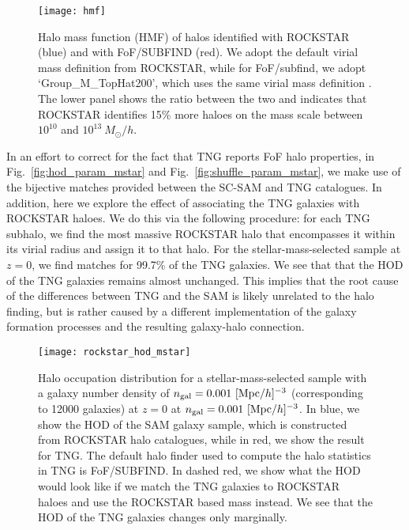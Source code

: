 \documentclass[fleqn,usenatbib]{mnras}
\begin{document}
\begin{figure}
\centering  
\texttt{[image: hmf]}
\caption{Halo mass function (HMF) of halos identified with \textsc{ROCKSTAR} (blue) and with FoF/\textsc{SUBFIND} (red). We adopt the default virial mass definition from \textsc{ROCKSTAR}, while for FoF/subfind, we adopt `Group\_M\_TopHat200', which uses the same virial mass definition \citep{1998ApJ...495...80B}. The lower panel shows the ratio between the two and indicates that \textsc{ROCKSTAR} identifies 15\% more haloes on the mass scale between $10^{10}$ and ${10^13} \ M_\odot/h$.}
\label{fig:hmf}
\end{figure}

In an effort to correct for the fact that TNG reports FoF halo properties, in Fig.~\ref{fig:hod_param_mstar} and Fig.~\ref{fig:shuffle_param_mstar}, we make use of the bijective matches provided between the SC-SAM and TNG catalogues. In addition, here we explore the effect of associating the TNG galaxies with \textsc{ROCKSTAR} haloes. We do this via the following procedure: for each TNG subhalo, we find the most massive \textsc{ROCKSTAR} halo that encompasses it within its virial radius and assign it to that halo. For the stellar-mass-selected sample at $z = 0$, we find matches for 99.7\% of the TNG galaxies. We see that that the HOD of the TNG galaxies remains almost unchanged. This implies that the root cause of the differences between TNG and the SAM is likely unrelated to the halo finding, but is rather caused by a different implementation of the galaxy formation processes and the resulting galaxy-halo connection.

\begin{figure}
\centering  
\texttt{[image: rockstar\_hod\_mstar]}
\caption{Halo occupation distribution for a stellar-mass-selected sample with a galaxy number density of $n_{\rm gal} = 0.001 \ [{\rm Mpc}/h]^{-3}$ (corresponding to 12000 galaxies) at $z = 0$ at $n_{\rm gal} = 0.001 \ [{\rm Mpc}/h]^{-3}$. In blue, we show the HOD of the SAM galaxy sample, which is constructed from ROCKSTAR halo catalogues, while in red, we show the result for TNG. The default halo finder used to compute the halo statistics in TNG is FoF/\textsc{SUBFIND}. In dashed red, we show what the HOD would look like if we match the TNG galaxies to ROCKSTAR haloes and use the ROCKSTAR based mass instead. We see that the HOD of the TNG galaxies changes only marginally.}
\label{fig:hod_rock}
\end{figure}
\end{document}
